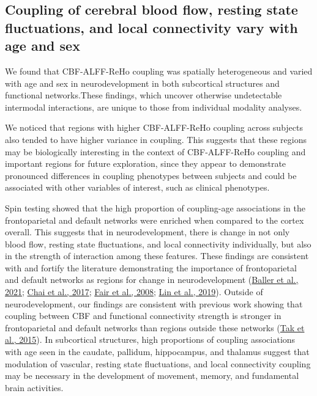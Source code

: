 \documentclass[
  12pt,
]{article}
\begin{document}
\hypertarget{coupling-of-cerebral-blood-flow-resting-state-fluctuations-and-local-connectivity-vary-with-age-and-sex}{%
\subsection{Coupling of cerebral blood flow, resting state fluctuations, and local connectivity vary with age and sex}\label{coupling-of-cerebral-blood-flow-resting-state-fluctuations-and-local-connectivity-vary-with-age-and-sex}}

We found that CBF-ALFF-ReHo coupling was spatially heterogeneous and varied with age and sex in neurodevelopment in both subcortical structures and functional networks.These findings, which uncover otherwise undetectable intermodal interactions, are unique to those from individual modality analyses.

We noticed that regions with higher CBF-ALFF-ReHo coupling across subjects also tended to have higher variance in coupling. This suggests that these regions may be biologically interesting in the context of CBF-ALFF-ReHo coupling and important regions for future exploration, since they appear to demonstrate pronounced differences in coupling phenotypes between subjects and could be associated with other variables of interest, such as clinical phenotypes.

Spin testing showed that the high proportion of coupling-age associations in the frontoparietal and default networks were enriched when compared to the cortex overall. This suggests that in neurodevelopment, there is change in not only blood flow, resting state fluctuations, and local connectivity individually, but also in the strength of interaction among these features. These findings are consistent with and fortify the literature demonstrating the importance of frontoparietal and default networks as regions for change in neurodevelopment (\protect\hyperlink{ref-ballerDevelopmentalCouplingCerebral2021}{Baller et al., 2021}; \protect\hyperlink{ref-chaiEvolutionBrainNetwork2017}{Chai et al., 2017}; \protect\hyperlink{ref-fairMaturingArchitectureBrain2008}{Fair et al., 2008}; \protect\hyperlink{ref-linDevelopmentFrontoparietalConnectivity2019}{Lin et al., 2019}). Outside of neurodevelopment, our findings are consistent with previous work showing that coupling between CBF and functional connectivity strength is stronger in frontoparietal and default networks than regions outside these networks (\protect\hyperlink{ref-takAssociationsRestingStateFMRI2015}{Tak et al., 2015}). In subcortical structures, high proportions of coupling associations with age seen in the caudate, pallidum, hippocampus, and thalamus suggest that modulation of vascular, resting state fluctuations, and local connectivity coupling may be necessary in the development of movement, memory, and fundamental brain activities.
\end{document}
